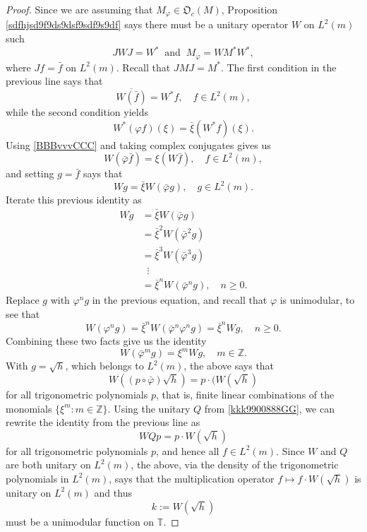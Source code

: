 \documentclass{dis}
\theoremstyle{plain}
\theoremstyle{definition}
\def\T{\mathbb{T}}
\def\Z{\mathbb{Z}}
\renewcommand{\geq}{\geqslant}
\renewcommand{\phi}{\varphi}
\newcommand{\0}{{\color{lightgray}0}}
\begin{document}
\begin{proof}
Since we are assuming that $M_{\phi} \in \mathfrak{O}_c(M)$, Proposition \ref{sdfhjsd9f9ds9dsf9sdf9s9df} says there must be a unitary operator $W$ on $L^2(m)$ such 
$$J W J = W^{*} \; \; \mbox{and} \; \; M_{\phi} = W M^{*} W^*,$$
where $J f = \bar f$ on $L^2(m)$. Recall that $J M J = M^{*}$. The first condition in the previous line says that 
\begin{equation}\label{BBBvvvCCC}
\overline{W(\bar f)} = W^{*} f, \quad f \in L^2(m),
\end{equation}
while the second condition yields 
$$W^{*}(\phi f)(\xi) = \bar \xi (W^{*} f)(\xi).$$
Using \eqref{BBBvvvCCC} and taking complex conjugates gives us 
$$W(\bar \phi \bar f)= \xi (W \bar f), \quad f \in L^2(m),$$
and setting $g = \bar f$ says that 
\begin{equation}\label{kkkBv12229}
W g = \bar \xi W(\bar \phi g), \quad g \in L^2(m).
\end{equation}
Iterate this previous identity as
\begin{align*}
W g  & = \bar \xi W(\bar \phi g)\\
& = \bar \xi^2 W(\bar \phi^2 g)\\
& = \bar \xi^3 W(\bar \phi^3 g)\\
 &  \; \; \vdots \\
& = \bar \xi^n W(\bar \phi^n g), \quad n \geq 0.
\end{align*}
Replace $g$ with $\phi^n g$ in the previous equation, and recall that $\phi$ is unimodular,  to see that 
$$W(\phi^n g) = \bar \xi^n W(\bar \phi^n \phi^n g)= \bar \xi^n W g, \quad n \geq 0.$$
Combining these two facts give us the identity 
$$W(\bar \phi^m g) = \xi^m W g, \quad m \in \Z.$$
With $g = \sqrt{h}$, which belongs to $L^2(m)$,  the above says that 
$$W((p \circ \bar \phi) \sqrt{h}) = p \cdot ( W(\sqrt{h})$$ for all trigonometric polynomials $p$, that is,  finite linear combinations of the monomials $\{\xi^{m}: m \in \Z\}$.  Using the unitary $Q$ from \eqref{kkk9900888GG}, we can rewrite the identity from the previous line as
$$W Q p  = p \cdot W(\sqrt{h})$$
for all trigonometric polynomials $p$, and hence all $f \in L^2(m)$. Since $W$ and $Q$ are both unitary on $L^2(m)$, the above, via the density of the trigonometric polynomials in $L^2(m)$, says that  the multiplication operator $f   \mapsto f \cdot W(\sqrt{h})$ is unitary on $L^2(m)$ and thus 
$$ k := W(\sqrt{h})$$ must be a unimodular function on $\T$. 


\end{proof}
\end{document}
